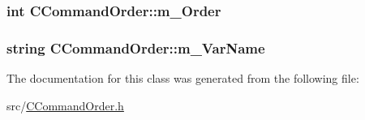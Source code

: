 \subsubsection[{\texorpdfstring{m\+\_\+\+Order}{m_Order}}]{\setlength{\rightskip}{0pt plus 5cm}int C\+Command\+Order\+::m\+\_\+\+Order}\hypertarget{classCCommandOrder_ab815291bf8d2fa527a2015ce5395d64e}{}\label{classCCommandOrder_ab815291bf8d2fa527a2015ce5395d64e}
\subsubsection[{\texorpdfstring{m\+\_\+\+Var\+Name}{m_VarName}}]{\setlength{\rightskip}{0pt plus 5cm}string C\+Command\+Order\+::m\+\_\+\+Var\+Name\hspace{0.3cm}{\ttfamily [private]}}\hypertarget{classCCommandOrder_a45fb2d9961cefa2347113dc870bec8fb}{}\label{classCCommandOrder_a45fb2d9961cefa2347113dc870bec8fb}


The documentation for this class was generated from the following file\+:\begin{DoxyCompactItemize}
\item 
src/\hyperlink{CCommandOrder_8h}{C\+Command\+Order.\+h}\end{DoxyCompactItemize}
